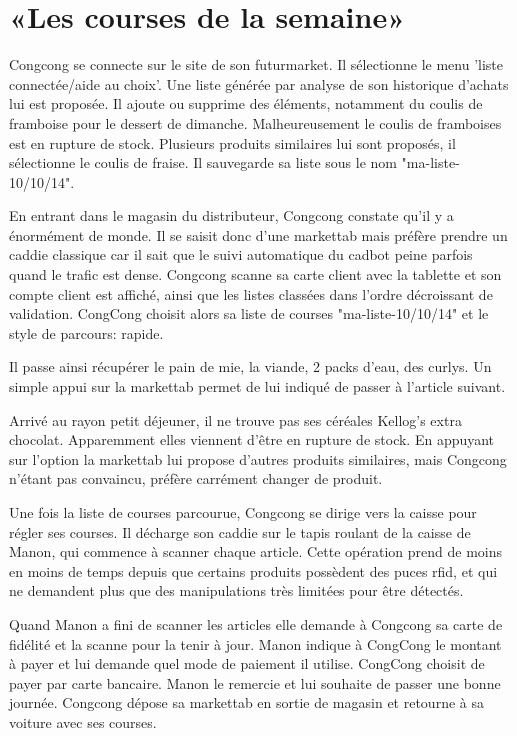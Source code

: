 \section{«Les courses de la semaine»}

Congcong se connecte sur le site de son futurmarket.
Il sélectionne le menu 'liste connectée/aide au choix'.
Une liste générée par analyse de son historique d'achats lui est proposée.
Il ajoute ou supprime des éléments, notamment du coulis de framboise pour le dessert de dimanche.
Malheureusement le coulis de framboises est en rupture de stock.
Plusieurs produits similaires lui sont proposés, il sélectionne le coulis de fraise.
Il sauvegarde sa liste sous le nom "ma-liste-10/10/14".
\par
En entrant dans le magasin du distributeur, Congcong constate qu'il y a énormément de monde.
Il se saisit donc d'une markettab mais préfère prendre un caddie classique car il sait que le suivi automatique du cadbot peine parfois quand le trafic est dense.
Congcong scanne sa carte client avec la tablette et son compte client est affiché, ainsi que les listes classées dans l'ordre décroissant de validation.
CongCong choisit alors sa liste de courses "ma-liste-10/10/14" et le style de parcours: rapide.\par
Il passe ainsi récupérer le pain de mie, la viande, 2 packs d'eau, des curlys.
Un simple appui sur la markettab permet de lui indiqué de passer à l'article suivant.
\par
Arrivé au rayon petit déjeuner, il ne trouve pas ses céréales Kellog's extra chocolat.
Apparemment elles viennent d'être en rupture de stock.
En appuyant sur l'option \type{[variante]} la markettab lui propose d'autres produits similaires, mais Congcong n'étant pas convaincu, préfère carrément changer de produit.
\par
Une fois la liste de courses parcourue, Congcong se dirige vers la caisse pour régler ses courses. 
Il décharge son caddie sur le tapis roulant de la caisse de Manon, qui commence à scanner chaque article.
Cette opération prend de moins en moins de temps depuis que certains produits possèdent des puces rfid, et qui ne demandent plus que des manipulations très limitées pour être détectés.
\par
Quand Manon a fini de scanner les articles elle demande à Congcong sa carte de fidélité et la scanne pour la tenir à jour.
Manon indique à CongCong le montant à payer et lui demande quel mode de paiement il utilise.
CongCong choisit de payer par carte bancaire. 
Manon le remercie et lui souhaite de passer une bonne journée.
Congcong dépose sa markettab en sortie de magasin et retourne à sa voiture avec ses courses.

